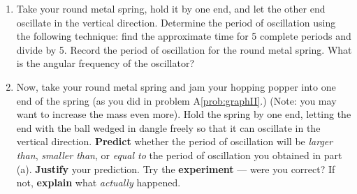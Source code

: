 \begin{exercise}
  \begin{enumerate}
  \item Take your round metal spring, hold it by one end, and let the
    other end oscillate in the vertical direction.  Determine the
    period of oscillation using the following technique: find the
    approximate time for 5 complete periods and divide by 5.  Record
    the period of oscillation for the round metal spring.  What is the
    angular frequency of the oscillator?

  \item Now, take your round metal spring and jam your 
    hopping popper 
    into one end of the spring (as you did in problem
    A\ref{prob:graphII}.)  (Note: you may want to increase the mass
    even more).  Hold the spring by one end, letting the end with the
    ball wedged in dangle freely so that it can oscillate in the
    vertical direction.  \textbf{Predict} whether the period of
    oscillation will be \emph{larger than}, \emph{smaller than}, or \emph{equal to} the period of oscillation you obtained in part (a).
    \textbf{Justify} your prediction.  Try the \textbf{experiment} --- were
    you correct?  If not, \textbf{explain} what \emph{actually} happened.

  \end{enumerate}
  \label{prob:period}
\end{exercise}


